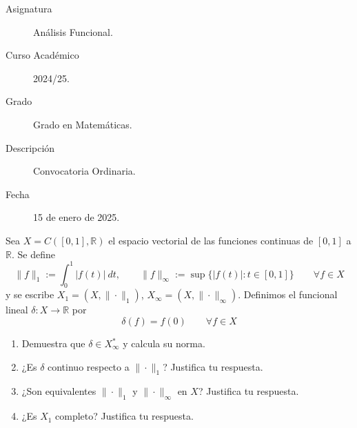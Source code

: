 \documentclass[12pt]{article}
\begin{document}

    
    

    \begin{description}
        \item[Asignatura] Análisis Funcional.
        \item[Curso Académico] 2024/25.
        \item[Grado] Grado en Matemáticas.
        \item[Descripción] Convocatoria Ordinaria.
        \item[Fecha] 15 de enero de 2025.
    
    \end{description}
    \newpage


    
    \begin{ejercicio}[2 puntos]
        Sea $X = C([0,1],\mathbb{R})$ el espacio vectorial de las funciones continuas de $[0,1]$ a $\mathbb{R}$. Se define
        \begin{equation*}
            \|f\|_1 := \int_{0}^{1} |f(t)|~dt , \qquad \|f\|_\infty := \sup\{|f(t)| : t\in [0,1]\}\qquad \forall f\in X
        \end{equation*}
        y se escribe $X_1 = (X,\|\cdot \|_1)$, $X_{\infty} = (X,\|\cdot \|_\infty)$. Definimos el funcional lineal $\delta:X\to \mathbb{R}$ por
        \begin{equation*}
            \delta(f) = f(0) \qquad \forall f\in X
        \end{equation*}
        \begin{enumerate}[label=\alph*)]
            \item Demuestra que $\delta\in X_\infty^\ast$ y calcula su norma.
            \item ¿Es $\delta$ continuo respecto a $\|\cdot \|_1$? Justifica tu respuesta.
            \item ¿Son equivalentes $\|\cdot \|_1$ y $\|\cdot \|_\infty$ en $X$? Justifica tu respuesta.
            \item ¿Es $X_1$ completo? Justifica tu respuesta.
        \end{enumerate}
    \end{ejercicio}
\end{document}
